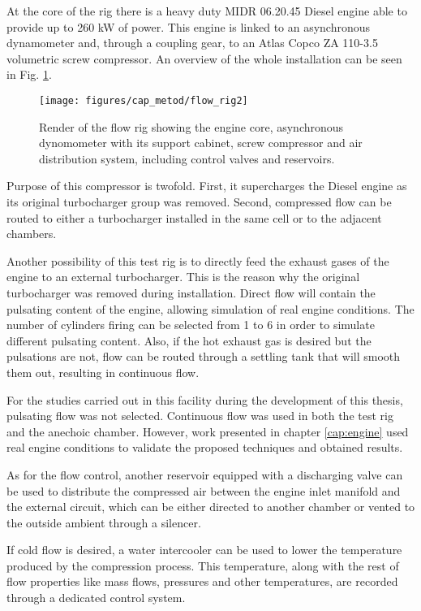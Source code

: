 At the core of the rig there is a heavy duty MIDR 06.20.45 Diesel engine able to provide up to 260 kW of power. This engine is linked to an asynchronous dynamometer and, through a coupling gear, to an Atlas Copco ZA 110-3.5 volumetric screw compressor. An overview of the whole installation can be seen in Fig. \ref{fig:flowrig_render}.

\begin{figure}[b!]
\centering
\texttt{[image: figures/cap\_metod/flow\_rig2]}
\caption[Render of the flow rig used to power the turbocharger]{Render of the flow rig showing the engine core, asynchronous dynomometer with its support cabinet, screw compressor and air distribution system, including control valves and reservoirs.}
\label{fig:flowrig_render}
\end{figure}

Purpose of this compressor is twofold. First, it supercharges the Diesel engine as its original turbocharger group was removed. Second, compressed flow can be routed to either a turbocharger installed in the same cell or to the adjacent chambers.

Another possibility of this test rig is to directly feed the exhaust gases of the engine to an external turbocharger. This is the reason why the original turbocharger was removed during installation. Direct flow will contain the pulsating content of the engine, allowing simulation of real engine conditions.
The number of cylinders firing can be selected from 1 to 6 in order to simulate different pulsating content. Also, if the hot exhaust gas is desired but the pulsations are not, flow can be routed through a settling tank that will smooth them out, resulting in continuous flow.

For the studies carried out in this facility during the development of this thesis, pulsating flow was not selected. Continuous flow was used in both the test rig and the anechoic chamber. However, work presented in chapter \ref{cap:engine} used real engine conditions to validate the proposed techniques and obtained results.

As for the flow control, another reservoir equipped with a discharging valve can be used to distribute the compressed air between the engine inlet manifold and the external circuit, which can be either directed to another chamber or vented to the outside ambient through a silencer.

If cold flow is desired, a water intercooler can be used to lower the temperature produced by the compression process. This temperature, along with the rest of flow properties like mass flows, pressures and other temperatures, are recorded through a dedicated control system.

